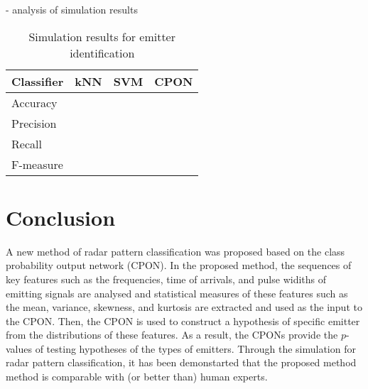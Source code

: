 \documentclass[runningheads,a4paper]{llncs}
\begin{document}
- analysis of simulation results

\vspace{5em}

\begin{table}[htbp]
\renewcommand{\arraystretch}{1.4}
\caption{Simulation results for emitter identification}
\label{tb1}
\centering
\begin{tabular}{|>{\centering\arraybackslash}m{2cm}|
>{\centering\arraybackslash}m{2cm}|>{\centering\arraybackslash}m{2cm}|>{\centering\arraybackslash}m{2cm}|} \hline\hline
Classifier    & kNN & SVM & CPON\\ \hline\hline
Accuracy    &        &         &          \\ \hline
Precision    &        &         &          \\ \hline
Recall        &        &         &          \\ \hline
F-measure &        &         &          \\ \hline
\end{tabular}%
\end{table}



\newpage
\section{Conclusion}

A new method of radar pattern classification was proposed based on the class probability output network (CPON). In the proposed method,
the sequences of key features such as the frequencies, time of arrivals, and pulse widiths of emitting signals are analysed and 
statistical measures of these features such as the mean, variance, skewness, and kurtosis are extracted and used as
the input to the CPON. Then, the CPON is used to construct a hypothesis of specific emitter from
the distributions of these features. As a result, the CPONs provide the $p$-values of testing hypotheses of the types of emitters.
Through the simulation for radar pattern classification, it has been demonstarted that the proposed method method is comparable with
(or better than) human experts.
\end{document}
